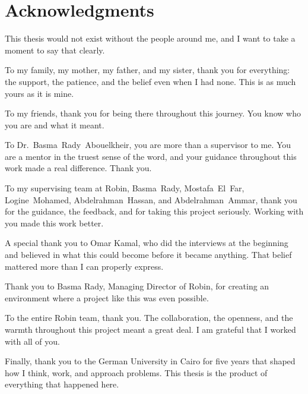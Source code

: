 \chapter*{Acknowledgments}
\label{chap:ack}

This thesis would not exist without the people around me, and I want to take a moment to say that clearly.

To my family, my mother, my father, and my sister, thank you for everything: the support, the patience, and the belief even when I had none. This is as much yours as it is mine.

To my friends, thank you for being there throughout this journey. You know who you are and what it meant.

To Dr.\ Basma~Rady~Abouelkheir, you are more than a supervisor to me. You are a mentor in the truest sense of the word, and your guidance throughout this work made a real difference. Thank you.

To my supervising team at Robin, \mbox{Basma~Rady}, \mbox{Mostafa~El~Far}, \mbox{Logine~Mohamed}, \mbox{Abdelrahman~Hassan}, and \mbox{Abdelrahman~Ammar}, thank you for the guidance, the feedback, and for taking this project seriously. Working with you made this work better.

A special thank you to Omar Kamal, who did the interviews at the beginning and believed in what this could become before it became anything. That belief mattered more than I can properly express.

Thank you to Basma Rady, Managing Director of Robin, for creating an environment where a project like this was even possible.

To the entire Robin team, thank you. The collaboration, the openness, and the warmth throughout this project meant a great deal. I am grateful that I worked with all of you.

Finally, thank you to the German University in Cairo for five years that shaped how I think, work, and approach problems. This thesis is the product of everything that happened here.
